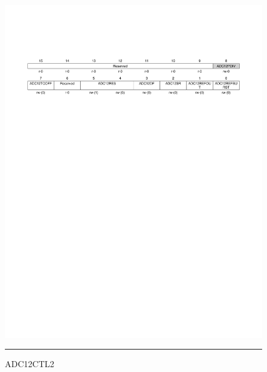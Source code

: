 \pagebreak
\begin{figure}[H]
  \centering
  \includegraphics [angle=0, width=16cm]{./Figures/Chap11_ADC/ADC12CTL2.pdf}
  \rule{35em}{0.5pt}
  \caption{ADC12CTL2}
  \label{fig:ADC12CTL2}
\end{figure}

